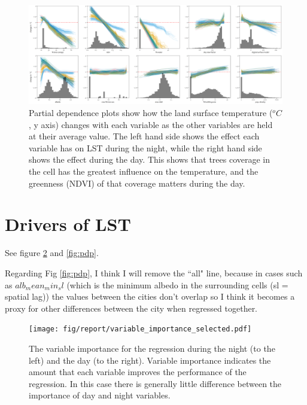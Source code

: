 \documentclass[]{elsarticle}
\begin{document}
\begin{figure}
    \centering
    \includegraphics[width=\linewidth]{fig/report/pdp_uncert_day.png}
    \caption{
    Partial dependence plots show how the land surface temperature ($^oC$, y axis) changes with each variable as the other variables are held at their average value. The left hand side shows the effect each variable has on LST during the night, while the right hand side shows the effect during the day. This shows that trees coverage in the cell has the greatest influence on the temperature, and the greenness (NDVI) of that coverage matters during the day.
    }
    \label{fig:pdp_day}
\end{figure}



\section{Drivers of LST}
See figure \ref{fig:importance} and \ref{fig:pdp}.

Regarding Fig \ref{fig:pdp}, I think I will remove the ``all" line, because in cases such as $alb_mean_min_sl$ (which is the minimum albedo in the surrounding cells (sl = spatial lag)) the values between the cities don't overlap so I think it becomes a proxy for other differences between the city when regressed together.

\begin{figure}[h]
\begin{center}
\texttt{[image: fig/report/variable\_importance\_selected.pdf]}
\caption{The variable importance for the regression during the night (to the left) and the day (to the right). Variable importance indicates the amount that each variable improves the performance of the regression.
In this case there is generally little difference between the importance of day and night variables.}
\label{fig:importance}
\end{center}
\end{figure}
\end{document}
